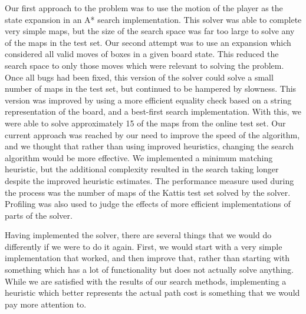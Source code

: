 \documentclass[a4paper,11pt]{article}
\begin{document}
Our first approach to the problem was to use the motion of the player as the
state expansion in an A* search implementation. This solver was able to complete
very simple maps, but the size of the search space was far too large to solve
any of the maps in the test set. Our second attempt was to use an expansion
which considered all valid moves of boxes in a given board state. This reduced
the search space to only those moves which were relevant to solving the
problem. Once all bugs had been fixed, this version of the solver could solve a
small number of maps in the test set, but continued to be hampered by
slowness. This version was improved by using a more efficient equality check
based on a string representation of the board, and a best-first search
implementation. With this, we were able to solve approximately 15 of the maps
from the online test set. Our current approach was reached by our need to
improve the speed of the algorithm, and we thought that rather than using
improved heuristics, changing the search algorithm would be more effective. We
implemented a minimum matching heuristic, but the additional complexity resulted
in the search taking longer despite the improved heuristic estimates. The
performance measure used during the process was the number of maps of the Kattis
test set solved by the solver. Profiling was also used to judge the effects of
more efficient implementations of parts of the solver.

Having implemented the solver, there are several things that we would do
differently if we were to do it again. First, we would start with a very simple
implementation that worked, and then improve that, rather than starting with
something which has a lot of functionality but does not actually solve
anything. While we are satisfied with the results of our search methods,
implementing a heuristic which better represents the actual path cost is
something that we would pay more attention to.

\printbibliography
\end{document}
